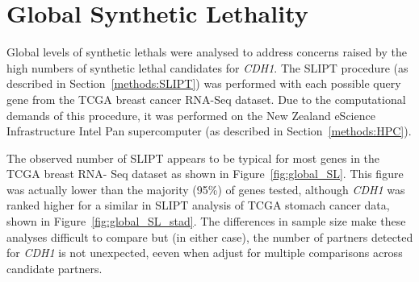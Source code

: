 \fi

\FloatBarrier

\iffalse
\section{Global Synthetic Lethality}

Global levels of \glspl{synthetic lethal} were analysed to address concerns raised by the high numbers of \gls{synthetic lethal} candidates for \textit{CDH1}. The \gls{SLIPT} procedure (as described in Section~\ref{methods:SLIPT}) was performed with each possible query gene from the \gls{TCGA} breast cancer \gls{RNA-Seq} dataset. Due to the computational demands of this procedure, it was performed on the New Zealand eScience Infrastructure Intel Pan supercomputer (as described in Section~\ref{methods:HPC}).

The observed number of \gls{SLIPT} appears to be typical for most genes in the \gls{TCGA} breast \acrshort{RNA}- Seq dataset as shown in Figure~\ref{fig:global_SL}. This figure was actually lower than the majority (95\%) of genes tested, although \textit{CDH1} was ranked higher for a similar in \gls{SLIPT} analysis of \gls{TCGA} stomach cancer data, shown in Figure~\ref{fig:global_SL_stad}. The differences in sample size make these analyses difficult to compare but (in either case), the number of partners detected for \textit{CDH1} is not unexpected, eeven when adjust for multiple comparisons across candidate partners.

